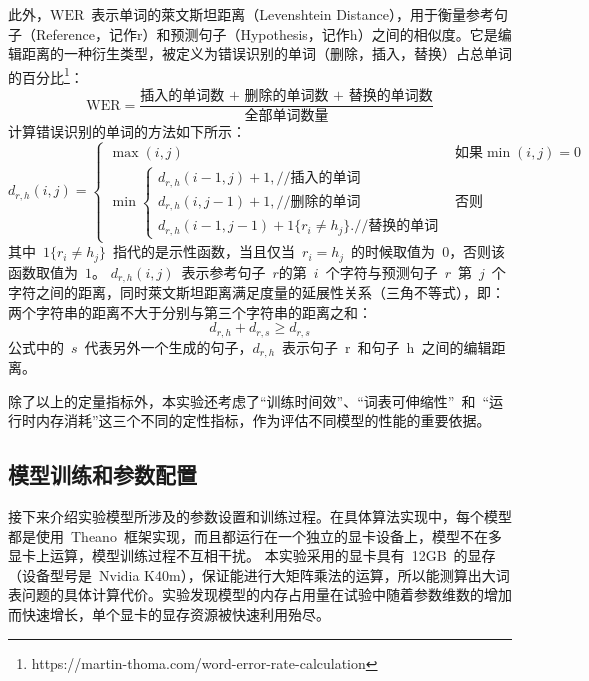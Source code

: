 此外，$\mathrm{WER}$~表示单词的萊文斯坦距离（Levenshtein Distance），用于衡量参考句子（Reference，记作r）和预测句子（Hypothesis，记作h）之间的相似度。它是编辑距离的一种衍生类型，被定义为错误识别的单词（删除，插入，替换）占总单词的百分比\footnote{https://martin-thoma.com/word-error-rate-calculation}：
\begin{equation}\label{equ:wer}
  \mathrm{WER} = \frac{\text{插入的单词数 + 删除的单词数 + 替换的单词数}}{\text{全部单词数量}}
\end{equation}
计算错误识别的单词的方法如下所示：
\begin{equation}\label{equ:distance}
d_{r,h}(i,j)=\begin{cases}
\max (i,j)& \text{如果}\min(i,j)=0\\
\min  \begin{cases}
d_{r,h}(i-1,j)+1,\text{//插入的单词}\\
d_{r,h}(i,j-1)+1,\text{//删除的单词}\\
d_{r,h}(i-1,j-1)+1\{r_i\neq h_j\}.\text{//替换的单词}
\end{cases} &\text{否则}
\end{cases}
\end{equation}
其中~$1\{r_i\neq h_j\}$~指代的是示性函数，当且仅当~$r_i= h_j$~的时候取值为~$0$，否则该函数取值为~$1$。 $d_{r,h}(i,j)$~表示参考句子~$r$的第~$i$~个字符与预测句子~$r$~第~$j$~个字符之间的距离，同时萊文斯坦距离满足度量的延展性关系（三角不等式），即： 两个字符串的距离不大于分别与第三个字符串的距离之和：
\begin{equation}
d_{r,h}+d_{r,s}\ge d_{r,s}
\end{equation}
公式中的~$s$~代表另外一个生成的句子，$d_{r,h}$~表示句子~r~和句子~h~之间的编辑距离。

除了以上的定量指标外，本实验还考虑了``训练时间效''、``词表可伸缩性''~和~``运行时内存消耗''这三个不同的定性指标，作为评估不同模型的性能的重要依据。

\subsection{模型训练和参数配置}
接下来介绍实验模型所涉及的参数设置和训练过程。在具体算法实现中，每个模型都是使用~Theano~框架实现，而且都运行在一个独立的显卡设备上，模型不在多显卡上运算，模型训练过程不互相干扰。
本实验采用的显卡具有~12GB~的显存（设备型号是~Nvidia K40m），保证能进行大矩阵乘法的运算，所以能测算出大词表问题的具体计算代价。实验发现模型的内存占用量在试验中随着参数维数的增加而快速增长，单个显卡的显存资源被快速利用殆尽。

